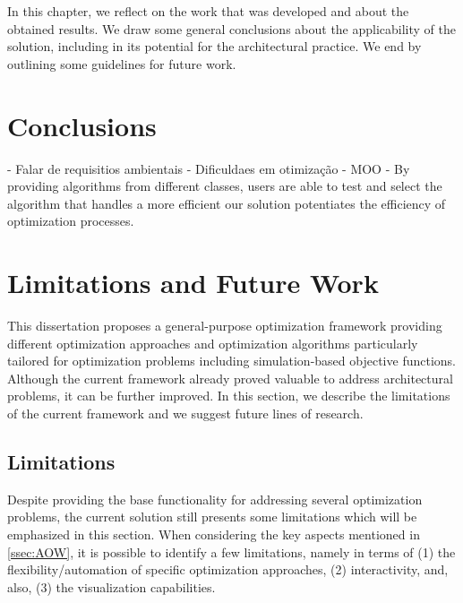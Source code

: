 \label{chap:conclusion}

In this chapter, we reflect on the work that was developed and about the obtained results. We draw some general conclusions about the applicability of the solution, including in its potential for the architectural practice. We end by outlining some guidelines for future work. 

\section{Conclusions}

- Falar de requisitios ambientais
- Dificuldaes em otimização 
- MOO
- 
By providing algorithms from different classes, users are able to test and select the algorithm that handles a more efficient 
our solution potentiates the efficiency of optimization processes. 



\section{Limitations and Future Work}

This dissertation proposes a general-purpose optimization framework providing different optimization approaches and optimization algorithms particularly tailored for optimization problems including simulation-based objective functions. Although the current framework already proved valuable to address architectural problems, it can be further improved. In this section, we describe the limitations of the current framework and we suggest future lines of research.

\subsection{Limitations}

Despite providing the base functionality for addressing several optimization problems, the current solution still presents some limitations which will be emphasized in this section. When considering the key aspects mentioned in \cref{ssec:AOW}, it is possible to identify a few limitations, namely in terms of (1) the flexibility/automation of specific optimization approaches, (2) interactivity, and, also, (3) the visualization capabilities.

